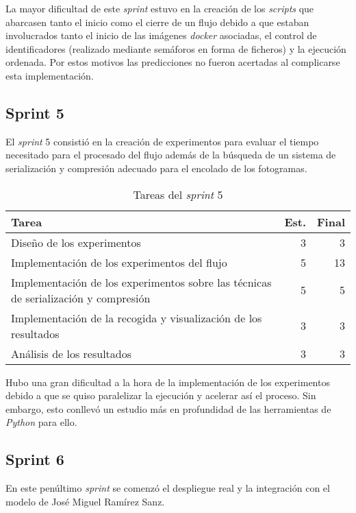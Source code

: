 La mayor dificultad de este \textit{sprint} estuvo en la creación de los \textit{scripts} que abarcasen tanto el inicio como el cierre de un flujo debido a que estaban involucrados tanto el inicio de las imágenes \textit{docker} asociadas, el control de identificadores (realizado mediante semáforos en forma de ficheros) y la ejecución ordenada. Por estos motivos las predicciones no fueron acertadas al complicarse esta implementación.

\subsection{Sprint 5}

El \textit{sprint} 5 consistió en la creación de experimentos para evaluar el tiempo necesitado para el procesado del flujo además de la búsqueda de un sistema de serialización y compresión adecuado para el encolado de los fotogramas. 

\begin{table}[H]
	\begin{tabularx}{\linewidth}{X r r}
		\toprule \textbf{Tarea} & \textbf{Est.} & \textbf{Final}\\
		\toprule
		Diseño de los experimentos & 3 & 3\\
		Implementación de los experimentos del flujo & 5 & 13\\
		Implementación de los experimentos sobre las técnicas de serialización y compresión & 5 & 5\\
		Implementación de la recogida y visualización de los resultados & 3 & 3\\
		Análisis de los resultados & 3 & 3\\
		\bottomrule
	\end{tabularx}
	\caption{Tareas del \textit{sprint} 5}
	\label{tab:sprint5}
\end{table}

Hubo una gran dificultad a la hora de la implementación de los experimentos debido a que se quiso paralelizar la ejecución y acelerar así el proceso. Sin embargo, esto conllevó un estudio más en profundidad de las herramientas de \textit{Python} para ello.

\subsection{Sprint 6}

En este penúltimo \textit{sprint} se comenzó el despliegue real y la integración con el modelo de José Miguel Ramírez Sanz. 

